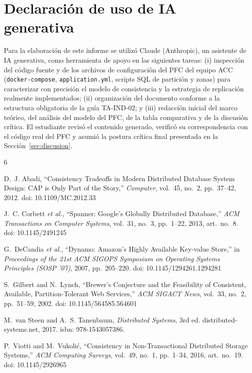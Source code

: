 \documentclass[11pt,a4paper]{article}
\begin{document}
\section{Declaraci\'on de uso de IA generativa}

Para la elaboraci\'on de este informe se utiliz\'o Claude (Anthropic), un asistente de IA
generativa, como herramienta de apoyo en las siguientes tareas: (i) inspecci\'on del c\'odigo
fuente y de los archivos de configuraci\'on del PFC del equipo ACC (\texttt{docker-compose},
\texttt{application.yml}, scripts SQL de partici\'on y zonas) para caracterizar con precisi\'on el
modelo de consistencia y la estrategia de replicaci\'on realmente implementados; (ii) organizaci\'on
del documento conforme a la estructura obligatoria de la gu\'ia TA-IND-02; y (iii) redacci\'on
inicial del marco te\'orico, del an\'alisis del modelo del PFC, de la tabla comparativa y de la
discusi\'on cr\'itica. El estudiante revis\'o el contenido generado, verific\'o su correspondencia
con el c\'odigo real del PFC y asumi\'o la postura cr\'itica final presentada en la
Secci\'on~\ref{sec:discusion}.

\begin{thebibliography}{6}

D.~J. Abadi, ``Consistency Tradeoffs in Modern Distributed Database System Design: CAP is Only
Part of the Story,'' \emph{Computer}, vol.~45, no.~2, pp.~37--42, 2012. doi:
10.1109/MC.2012.33

J.~C. Corbett \emph{et al.}, ``Spanner: Google's Globally Distributed Database,'' \emph{ACM
Transactions on Computer Systems}, vol.~31, no.~3, pp.~1--22, 2013, art.\ no.~8. doi:
10.1145/2491245

G.~DeCandia \emph{et al.}, ``Dynamo: Amazon's Highly Available Key-value Store,'' in
\emph{Proceedings of the 21st ACM SIGOPS Symposium on Operating Systems Principles (SOSP
'07)}, 2007, pp.~205--220. doi: 10.1145/1294261.1294281

S.~Gilbert and N.~Lynch, ``Brewer's Conjecture and the Feasibility of Consistent, Available,
Partition-Tolerant Web Services,'' \emph{ACM SIGACT News}, vol.~33, no.~2, pp.~51--59, 2002.
doi: 10.1145/564585.564601

M.~van Steen and A.~S. Tanenbaum, \emph{Distributed Systems}, 3rd ed. distributed-systems.net,
2017. isbn: 978-1543057386.

P.~Viotti and M.~Vukoli\'c, ``Consistency in Non-Transactional Distributed Storage Systems,''
\emph{ACM Computing Surveys}, vol.~49, no.~1, pp.~1--34, 2016, art.\ no.~19. doi:
10.1145/2926965

\end{thebibliography}
\end{document}
